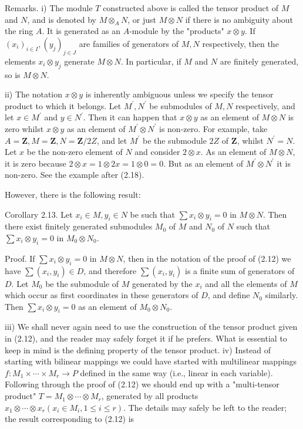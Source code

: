 \documentclass{standalone}
\theoremstyle{definition}
\theoremstyle{remark}
\begin{document}
Remarks. i) The module $T$ constructed above is called the tensor product of $M$ and $N$, and is denoted by $M \otimes_{A} N$, or just $M \otimes N$ if there is no ambiguity about the ring $A$. It is generated as an $A$-module by the "products" $x \otimes y$. If $\left(x_{i}\right)_{i \in I},\left(y_{j}\right)_{j \in J}$ are families of generators of $M, N$ respectively, then the elements $x_{i} \otimes y_{j}$ generate $M \otimes N$. In particular, if $M$ and $N$ are finitely generated, so is $M \otimes N$.

ii) The notation $x \otimes y$ is inherently ambiguous unless we specify the tensor product to which it belongs. Let $M^{\prime}, N^{\prime}$ be submodules of $M, N$ respectively, and let $x \in M^{\prime}$ and $y \in N^{\prime}$. Then it can happen that $x \otimes y$ as an element of $M \otimes N$ is zero whilst $x \otimes y$ as an element of $M^{\prime} \otimes N^{\prime}$ is non-zero. For example, take $A=\mathbf{Z}, M=\mathbf{Z}, N=\mathbf{Z} / 2 Z$, and let $M^{\prime}$ be the submodule $2 Z$ of $\mathbf{Z}$, whilst $N^{\prime}=N$. Let $x$ be the non-zero element of $N$ and consider $2 \otimes x$. As an element of $M \otimes N$, it is zero because $2 \otimes x=1 \otimes 2 x=1 \otimes 0=0$. But as an element of $M^{\prime} \otimes N^{\prime}$ it is non-zero. See the example after (2.18).

However, there is the following result:

Corollary 2.13. Let $x_{i} \in M, y_{i} \in N$ be such that $\sum x_{i} \otimes y_{i}=0$ in $M \otimes N$. Then there exist finitely generated submodules $M_{0}$ of $M$ and $N_{0}$ of $N$ such that $\sum x_{i} \otimes y_{i}=0$ in $M_{0} \otimes N_{0}$.

Proof. If $\sum x_{i} \otimes y_{i}=0$ in $M \otimes N$, then in the notation of the proof of (2.12) we have $\sum\left(x_{i}, y_{i}\right) \in D$, and therefore $\sum\left(x_{i}, y_{i}\right)$ is a finite sum of generators of $D$. Let $M_{0}$ be the submodule of $M$ generated by the $x_{i}$ and all the elements of $M$ which occur as first coordinates in these generators of $D$, and define $N_{0}$ similarly. Then $\sum x_{i} \otimes y_{i}=0$ as an element of $M_{0} \otimes N_{0}$.

iii) We shall never again need to use the construction of the tensor product given in (2.12), and the reader may safely forget it if he prefers. What is essential to keep in mind is the defining property of the tensor product. iv) Instead of starting with bilinear mappings we could have started with multilinear mappings $f: M_{1} \times \cdots \times M_{r} \rightarrow P$ defined in the same way (i.e., linear in each variable). Following through the proof of (2.12) we should end up with a "multi-tensor product" $T=M_{1} \otimes \cdots \otimes M_{r}$, generated by all products $x_{1} \otimes \cdots \otimes x_{r}\left(x_{i} \in M_{i}, 1 \leqslant i \leqslant r\right)$. The details may safely be left to the reader; the result corresponding to (2.12) is
\end{document}
